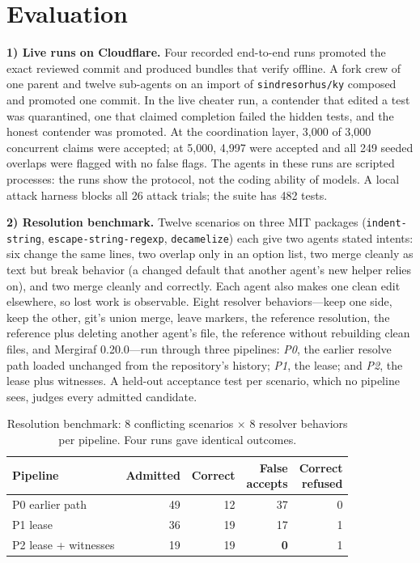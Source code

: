 \documentclass[10pt,conference]{IEEEtran}
\begin{document}
\section{Evaluation}\label{sec:eval}
\textbf{1) Live runs on Cloudflare.} Four recorded end-to-end runs promoted the exact reviewed commit and produced bundles that verify offline. A fork crew of one parent and twelve sub-agents on an import of \texttt{sindresorhus/ky} composed and promoted one commit. In the live cheater run, a contender that edited a test was quarantined, one that claimed completion failed the hidden tests, and the honest contender was promoted. At the coordination layer, 3,000 of 3,000 concurrent claims were accepted; at 5,000, 4,997 were accepted and all 249 seeded overlaps were flagged with no false flags. The agents in these runs are scripted processes: the runs show the protocol, not the coding ability of models. A local attack harness blocks all 26 attack trials; the suite has 482 tests.

\textbf{2) Resolution benchmark.} Twelve scenarios on three MIT packages (\texttt{indent-string}, \texttt{escape-string-regexp}, \texttt{decamelize}) each give two agents stated intents: six change the same lines, two overlap only in an option list, two merge cleanly as text but break behavior (a changed default that another agent's new helper relies on), and two merge cleanly and correctly. Each agent also makes one clean edit elsewhere, so lost work is observable. Eight resolver behaviors---keep one side, keep the other, git's union merge, leave markers, the reference resolution, the reference plus deleting another agent's file, the reference without rebuilding clean files, and Mergiraf 0.20.0---run through three pipelines: \emph{P0}, the earlier resolve path loaded unchanged from the repository's history; \emph{P1}, the lease; and \emph{P2}, the lease plus witnesses. A held-out acceptance test per scenario, which no pipeline sees, judges every admitted candidate.

\begin{table}[t]
\caption{Resolution benchmark: 8 conflicting scenarios $\times$ 8 resolver behaviors per pipeline. Four runs gave identical outcomes.}
\label{tab:bench}
\centering
\setlength{\tabcolsep}{4pt}
\begin{tabular}{@{}lrrrr@{}}
\toprule
Pipeline & Admitted & Correct & \shortstack[r]{False\\accepts} & \shortstack[r]{Correct\\refused}\\
\midrule
P0 earlier path & 49 & 12 & 37 & 0\\
P1 lease & 36 & 19 & 17 & 1\\
P2 lease + witnesses & 19 & 19 & \textbf{0} & 1\\
\bottomrule
\end{tabular}
\end{table}
\end{document}
